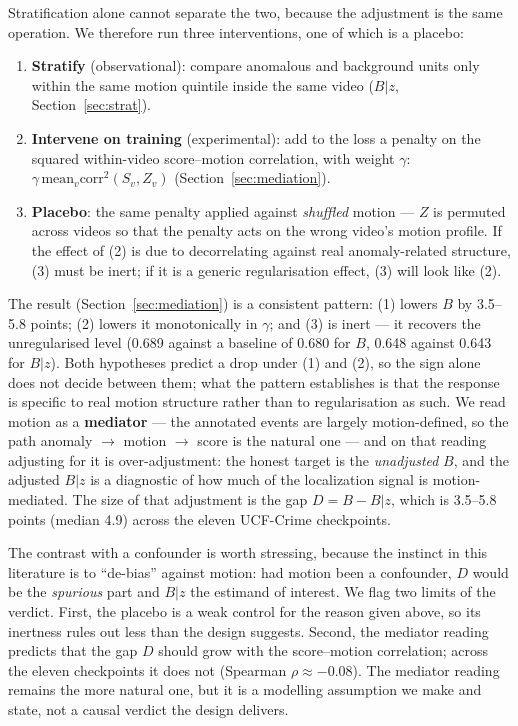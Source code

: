 \documentclass[number,preprint,12pt]{elsarticle}
\providecommand{\tightlist}{\setlength{\itemsep}{0pt}\setlength{\parskip}{0pt}}
\begin{document}
Stratification alone cannot separate the two, because the adjustment is the same
operation. We therefore run three interventions, one of which is a placebo:

\begin{enumerate}
\def\labelenumi{\arabic{enumi}.}
\tightlist
\item
  \textbf{Stratify} (observational): compare anomalous and background units only
  within the same motion quintile inside the same video (\(B|z\), Section~\ref{sec:strat}).
\item
  \textbf{Intervene on training} (experimental): add to the loss a penalty on the
  squared within-video score--motion correlation, with weight \(\gamma\):
  \(\gamma\,\mathrm{mean}_v\mathrm{corr}^2(S_v,Z_v)\)
  (Section~\ref{sec:mediation}).
\item
  \textbf{Placebo}: the same penalty applied against \emph{shuffled} motion --- \(Z\) is
  permuted across videos so that the penalty acts on the wrong video's motion
  profile. If the effect of (2) is due to decorrelating against real
  anomaly-related structure, (3) must be inert; if it is a generic
  regularisation effect, (3) will look like (2).
\end{enumerate}

The result (Section~\ref{sec:mediation}) is a consistent pattern: (1) lowers \(B\) by 3.5--5.8 points; (2)
lowers it monotonically in \(\gamma\); and (3) is inert --- it recovers the
unregularised level (0.689 against a baseline of 0.680 for \(B\), 0.648 against 0.643 for
\(B|z\)). Both hypotheses predict a drop under (1) and (2), so the sign alone does
not decide between them; what the pattern establishes is that the response is
specific to real motion structure rather than to regularisation as such. We read
motion as a \textbf{mediator} --- the annotated events are largely motion-defined, so
the path anomaly \(\to\) motion \(\to\) score is the natural one --- and on that
reading adjusting for it is over-adjustment: the honest target is the
\emph{unadjusted} \(B\), and the adjusted \(B|z\) is a diagnostic of how much of the
localization signal is motion-mediated. The size of that adjustment is the gap
\(D=B-B|z\), which is 3.5--5.8 points (median 4.9) across the eleven UCF-Crime
checkpoints.

The contrast with a confounder is worth stressing, because the instinct in this
literature is to ``de-bias'' against motion: had motion been a confounder, \(D\)
would be the \emph{spurious} part and \(B|z\) the estimand of interest. We flag two
limits of the verdict. First, the placebo is a weak control for the reason given
above, so its inertness rules out less than the design suggests. Second, the
mediator reading predicts that the gap \(D\) should grow with the score--motion
correlation; across the eleven checkpoints it does not (Spearman
\(\rho\approx-0.08\)). The mediator reading remains the more natural one, but it is
a modelling assumption we make and state, not a causal verdict the design
delivers.
\end{document}
